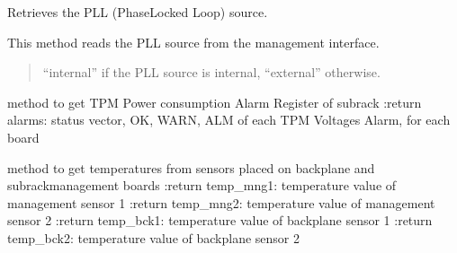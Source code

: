 \documentclass[letterpaper,10pt,english]{sphinxmanual}
\begin{document}
\begin{fulllineitems}

\begin{fulllineitems}
\label{\detokenize{apidocs:subrack_management_board.SubrackMngBoard.GetPllSource}}
\pysigstartsignatures
{}
\pysigstopsignatures
\sphinxAtStartPar
Retrieves the PLL (Phase\sphinxhyphen{}Locked Loop) source.

\sphinxAtStartPar
This method reads the PLL source from the management interface.
\begin{quote}\begin{description}
\sphinxAtStartPar
“internal” if the PLL source is internal, “external” otherwise.

\end{description}\end{quote}

\end{fulllineitems}


\begin{fulllineitems}
\label{\detokenize{apidocs:subrack_management_board.SubrackMngBoard.GetPowerAlarm}}
\pysigstartsignatures
{}
\pysigstopsignatures
\sphinxAtStartPar
method to get TPM Power consumption Alarm Register of subrack
:return alarms: status vector, OK, WARN, ALM of each TPM Voltages Alarm, for each board

\end{fulllineitems}


\begin{fulllineitems}
\label{\detokenize{apidocs:subrack_management_board.SubrackMngBoard.GetSubrackTemperatures}}
\pysigstartsignatures
{}
\pysigstopsignatures
\sphinxAtStartPar
method to get temperatures from sensors placed on backplane and subrack\sphinxhyphen{}management boards
:return temp\_mng1: temperature value of management sensor 1
:return temp\_mng2: temperature value of management sensor 2
:return temp\_bck1: temperature value of backplane sensor 1
:return temp\_bck2: temperature value of backplane sensor 2


\end{fulllineitems}
\end{fulllineitems}
\end{document}
